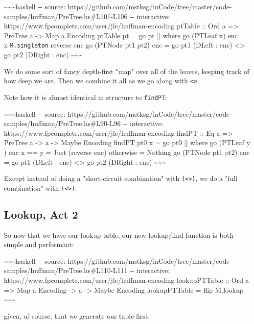 \documentclass[]{article}
\begin{document}
\textasciitilde{}\textasciitilde{}\textasciitilde{}haskell -\/- source:
https://github.com/mstksg/inCode/tree/master/code-samples/huffman/PreTree.hs\#L101-L106
-\/- interactive: https://www.fpcomplete.com/user/jle/huffman-encoding ptTable
:: Ord a =\textgreater{} PreTree a -\textgreater{} Map a Encoding ptTable pt =
go pt {[}{]} where go (PTLeaf x) enc = x \texttt{M.singleton} reverse enc go
(PTNode pt1 pt2) enc = go pt1 (DLeft : enc) \textless{}\textgreater{} go pt2
(DRight : enc) \textasciitilde{}\textasciitilde{}\textasciitilde{}

We do some sort of fancy depth-first "map" over all of the leaves, keeping track
of how deep we are. Then we combine it all as we go along with
\texttt{\textless{}\textgreater{}}.

Note how it is almost identical in structure to \texttt{findPT}:

\textasciitilde{}\textasciitilde{}\textasciitilde{}haskell -\/- source:
https://github.com/mstksg/inCode/tree/master/code-samples/huffman/PreTree.hs\#L90-L96
-\/- interactive: https://www.fpcomplete.com/user/jle/huffman-encoding findPT ::
Eq a =\textgreater{} PreTree a -\textgreater{} a -\textgreater{} Maybe Encoding
findPT pt0 x = go pt0 {[}{]} where go (PTLeaf y ) enc \textbar{} x == y = Just
(reverse enc) \textbar{} otherwise = Nothing go (PTNode pt1 pt2) enc = go pt1
(DLeft : enc) \textless{}\textbar{}\textgreater{} go pt2 (DRight : enc)
\textasciitilde{}\textasciitilde{}\textasciitilde{}

Except instead of doing a "short-circuit combination" with
\texttt{(\textless{}\textbar{}\textgreater{})}, we do a "full combination" with
\texttt{(\textless{}\textgreater{})}.

\subsection{Lookup, Act 2}

So now that we have our lookup table, our new lookup/find function is both
simple and performant:

\textasciitilde{}\textasciitilde{}\textasciitilde{}haskell -\/- source:
https://github.com/mstksg/inCode/tree/master/code-samples/huffman/PreTree.hs\#L110-L111
-\/- interactive: https://www.fpcomplete.com/user/jle/huffman-encoding
lookupPTTable :: Ord a =\textgreater{} Map a Encoding -\textgreater{} a
-\textgreater{} Maybe Encoding lookupPTTable = flip M.lookup
\textasciitilde{}\textasciitilde{}\textasciitilde{}

given, of course, that we generate our table first.
\end{document}
